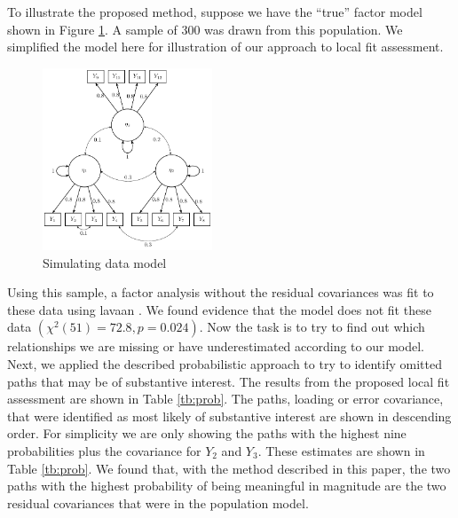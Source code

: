 \documentclass[noextraspace, floatsintext, 12pt]{apa7}
\begin{document}
To illustrate the proposed method, suppose we have the ``true'' factor model shown in Figure \ref{fig:model}.
A sample of 300 was drawn from this population.
We simplified the model here for illustration of our approach to local fit assessment.
\begin{figure}
\centering
\includegraphics[width=0.45\textwidth]{fig/sim_factor_structure_values}
\caption{Simulating data model}
\label{fig:model}
\end{figure}
Using this sample, a factor analysis without the residual covariances was fit to these data using \textsf{lavaan} \citep{Rosseel2012}.
We found evidence that the model does not fit these data $(\chi^2(51) = 72.8, p = 0.024)$.
Now the task is to try to find out which relationships we are missing or have underestimated according to our model.
Next, we applied the described probabilistic approach to try to identify omitted paths that may be of substantive interest. 
The results from the proposed local fit assessment are shown in Table \ref{tb:prob}. The paths, loading or  error covariance, that were identified as most likely of substantive interest are shown in descending order.
For simplicity we are only showing the paths with the highest nine probabilities plus the covariance for $Y_2$ and $Y_3$.
These estimates are shown in Table \ref{tb:prob}.
We found that, with the method described in this paper, the two paths with the highest probability of being meaningful in magnitude are the two residual covariances that were in the population model.
\end{document}
